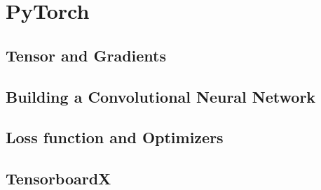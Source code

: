 \section{PyTorch}





\subsection{Tensor and Gradients}



\subsection{Building a Convolutional Neural Network}



\subsection{Loss function and Optimizers}



\subsection{TensorboardX}


